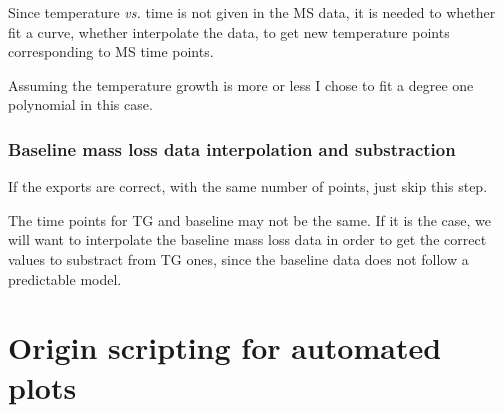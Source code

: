\documentclass[a4paper, 11pt, raggedright, parskip, sans, colorful]{tufte-style-article}
\begin{document}
Since temperature \textit{vs.} time is not given in the MS data, it is needed to whether fit a curve, whether interpolate the data, to get new temperature points corresponding to MS time points.
 
Assuming the temperature growth is more or less I chose to fit a degree one polynomial in this case.


\subsubsection[Baseline mass loss data interpolation and substraction]{Baseline mass loss data interpolation and substraction}

If the exports are correct, with the same number of points, just skip this step.

The time points for TG and baseline may not be the same. If it is the case, we will want to interpolate the baseline mass loss data in order to get the correct values to substract from TG ones, since the baseline data does not follow a predictable model.










\section{Origin scripting for automated plots}
\label{sec:origin_scripting}	
	
\end{document}
